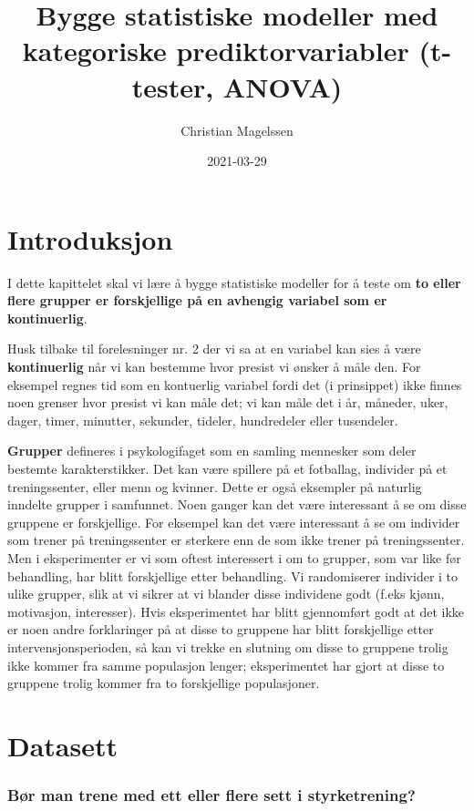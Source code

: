 \documentclass[
]{book}
\title{Bygge statistiske modeller med kategoriske prediktorvariabler (t-tester, ANOVA)}
\author{Christian Magelssen}
\date{2021-03-29}
\begin{document}
\maketitle

{
\setcounter{tocdepth}{1}
\tableofcontents
}
\hypertarget{intro}{%
\chapter{Introduksjon}\label{intro}}

I dette kapittelet skal vi lære å bygge statistiske modeller for å teste om \textbf{to eller flere grupper er forskjellige på en avhengig variabel som er kontinuerlig}.

Husk tilbake til forelesninger nr. 2 der vi sa at en variabel kan sies å være \textbf{kontinuerlig} når vi kan bestemme hvor presist vi ønsker å måle den. For eksempel regnes tid som en kontuerlig variabel fordi det (i prinsippet) ikke finnes noen grenser hvor presist vi kan måle det; vi kan måle det i år, måneder, uker, dager, timer, minutter, sekunder, tideler, hundredeler eller tusendeler.

\textbf{Grupper} defineres i psykologifaget som en samling mennesker som deler bestemte karakterstikker. Det kan være spillere på et fotballag, individer på et treningssenter, eller menn og kvinner. Dette er også eksempler på naturlig inndelte grupper i samfunnet. Noen ganger kan det være interessant å se om disse gruppene er forskjellige. For eksempel kan det være interessant å se om individer som trener på treningssenter er sterkere enn de som ikke trener på treningssenter. Men i eksperimenter er vi som oftest interessert i om to grupper, som var like før behandling, har blitt forskjellige etter behandling. Vi randomiserer individer i to ulike grupper, slik at vi sikrer at vi blander disse individene godt (f.eks kjønn, motivasjon, interesser). Hvis eksperimentet har blitt gjennomført godt at det ikke er noen andre forklaringer på at disse to gruppene har blitt forskjellige etter intervensjonsperioden, så kan vi trekke en slutning om disse to gruppene trolig ikke kommer fra samme populasjon lenger; eksperimentet har gjort at disse to gruppene trolig kommer fra to forskjellige populasjoner.

\hypertarget{datasett}{%
\chapter{Datasett}\label{datasett}}

\hypertarget{buxf8r-man-trene-med-ett-eller-flere-sett-i-styrketrening}{%
\subsection{Bør man trene med ett eller flere sett i styrketrening?}\label{buxf8r-man-trene-med-ett-eller-flere-sett-i-styrketrening}}
\end{document}
